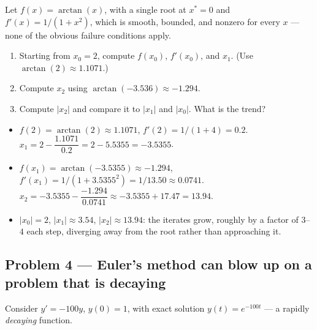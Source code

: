 Let $f(x) = \arctan(x)$, with a single root at $x^\ast=0$ and $f'(x) = 1/(1+x^2)$, which is smooth, bounded, and nonzero for every $x$ --- none of the obvious failure conditions apply.

\begin{enumerate}[label=(\alph*)]
\item Starting from $x_0=2$, compute $f(x_0)$, $f'(x_0)$, and $x_1$. (Use $\arctan(2)\approx1.1071$.)
\item Compute $x_2$ using $\arctan(-3.536) \approx -1.294$.
\item Compute $|x_2|$ and compare it to $|x_1|$ and $|x_0|$. What is the trend?
\end{enumerate}

\solution
\begin{itemize}
\item[(a)] $f(2)=\arctan(2)\approx1.1071$, $f'(2)=1/(1+4)=0.2$. $x_1 = 2 - \dfrac{1.1071}{0.2} = 2-5.5355 = -3.5355$.
\item[(b)] $f(x_1)=\arctan(-3.5355)\approx-1.294$, $f'(x_1) = 1/(1+3.5355^2) = 1/13.50 \approx 0.0741$. $x_2 = -3.5355 - \dfrac{-1.294}{0.0741} \approx -3.5355+17.47 = 13.94$.
\item[(c)] $|x_0|=2$, $|x_1|\approx3.54$, $|x_2|\approx13.94$: the iterates grow, roughly by a factor of $3$--$4$ each step, diverging away from the root rather than approaching it.
\end{itemize}


\subsection*{Problem 4 --- Euler's method can blow up on a problem that is decaying}

Consider $y' = -100y$, $y(0)=1$, with exact solution $y(t)=e^{-100t}$ --- a rapidly \emph{decaying} function.

